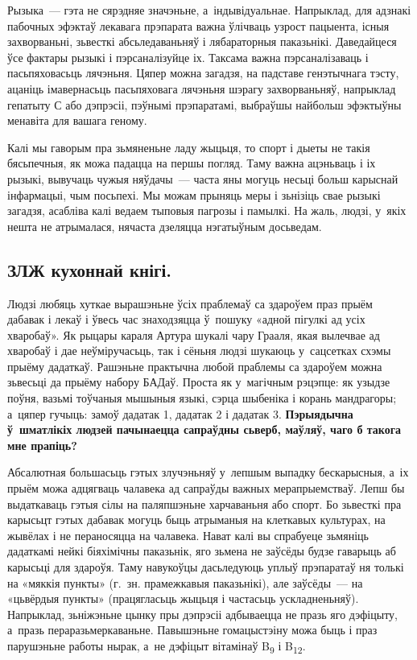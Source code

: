 Рызыка~--- гэта не сярэдняе значэньне, а~індывідуальнае. Напрыклад, для адзнакі пабочных эфэктаў лекавага прэпарата важна ўлічваць узрост пацыента, існыя захворваньні, зьвесткі абсьледаваньняў і лябараторныя паказьнікі. Даведайцеся ўсе фактары рызыкі і пэрсаналізуйце іх. Таксама важна пэрсаналізаваць і пасьпяховасьць лячэньня. Цяпер можна загадзя, на падставе генэтычнага тэсту, ацаніць імавернасьць пасьпяховага лячэньня шэрагу захворваньняў, напрыклад гепатыту С або дэпрэсіі, пэўнымі прэпаратамі, выбраўшы найбольш эфэктыўны менавіта для вашага геному.

Калі мы гаворым пра зьмяненьне ладу жыцьця, то спорт і дыеты не такія бясьпечныя, як можа падацца на першы погляд. Таму важна ацэньваць і іх рызыкі, вывучаць чужыя няўдачы~--- часта яны могуць несьці больш карыснай інфармацыі, чым посьпехі. Мы можам прыняць меры і зьнізіць свае рызыкі загадзя, асабліва калі ведаем тыповыя пагрозы і памылкі. На жаль, людзі, у~якіх нешта не атрымалася, нячаста дзеляцца нэгатыўным досьведам.

\subsection*{ЗЛЖ кухоннай кнігі.}

Людзі любяць хуткае вырашэньне ўсіх праблемаў са здароўем праз прыём дабавак і лекаў і ўвесь час знаходзяцца ў~пошуку «адной пігулкі ад усіх хваробаў». Як рыцары караля Артура шукалі чару Грааля, якая вылечвае ад хваробаў і дае неўміручасьць, так і сёньня людзі шукаюць у~сацсетках схэмы прыёму дадаткаў. Рашэньне практычна любой праблемы са здароўем можна зьвесьці да прыёму набору БАДаў. Проста як у~магічным рэцэпце: як узыдзе поўня, вазьмі тоўчаныя мышыныя языкі, сэрца шыбеніка і корань мандрагоры; а~цяпер гучыць: замоў дадатак 1, дадатак 2 і дадатак 3. \textbf{Пэрыядычна ў~шматлікіх людзей пачынаецца сапраўдны сьверб, маўляў, чаго б такога мне прапіць?}

Абсалютная большасьць гэтых злучэньняў у~лепшым выпадку бескарысныя, а~іх прыём можа адцягваць чалавека ад сапраўды важных мерапрыемстваў. Лепш бы выдаткаваць гэтыя сілы на паляпшэньне харчаваньня або спорт. Бо зьвесткі пра карысьцт гэтых дабавак могуць быць атрыманыя на клеткавых культурах, на жывёлах і не пераносяцца на чалавека. Нават калі вы спрабуеце зьмяніць дадаткамі нейкі біяхімічны паказьнік, яго зьмена не заўсёды будзе гаварыць аб карысьці для здароўя. Таму навукоўцы дасьледуюць уплыў прэпаратаў ня толькі на «мяккія пункты» (г.~зн. прамежкавыя паказьнікі), але заўсёды~--- на «цьвёрдыя пункты» (працягласьць жыцьця і частасьць ускладненьняў). Напрыклад, зьніжэньне цынку пры дэпрэсіі адбываецца не празь яго дэфіцыту, а~празь пераразьмеркаваньне. Павышэньне гомацыстэіну можа быць і праз парушэньне работы нырак, а~не дэфіцыт вітамінаў B\textsubscript{9} і B\textsubscript{12}.

